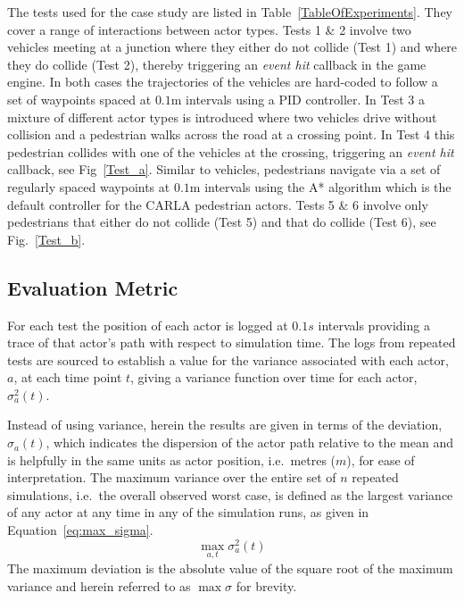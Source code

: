 The tests used for the case study are listed in Table~\ref{TableOfExperiments}. They cover a range of interactions between actor types. 
%
Tests 1 \& 2 involve two vehicles meeting at a junction where they either do not collide (Test 1) and where they do collide (Test 2), thereby triggering an \textit{event hit} callback in the game engine. In both cases the trajectories of the vehicles are hard-coded to follow a set of waypoints spaced at $0.1$m intervals using a PID controller. 
%
In Test 3 a mixture of different actor types is introduced where two vehicles drive without collision and a pedestrian walks across the road at a crossing point. 
%
In Test 4 this pedestrian collides with one of the vehicles at the crossing, triggering an \textit{event hit} callback, see Fig~\ref{Test_a}. Similar to vehicles, pedestrians navigate via a set of regularly spaced waypoints at $0.1$m intervals using the A* algorithm which is the default controller for the CARLA pedestrian actors. Tests 5 \& 6 involve only pedestrians that either do not collide (Test 5) and that do collide (Test 6), see Fig.~\ref{Test_b}. 


\subsection{Evaluation Metric}\label{s:Experiment_Description}
For each test the position of each actor is logged at $0.1s$ intervals providing a trace of that actor's path with respect to simulation time. The logs from repeated tests are sourced to establish a value for the variance associated with each actor, $a$, at each time point $t$, giving a variance function over time for each actor, $\sigma_a^{2}(t)$.

Instead of using variance, herein the results are given in terms of the deviation, $\sigma_a(t)$, which indicates the dispersion of the actor path relative to the mean and is helpfully in the same units as actor position, i.e.\ metres ($m$), for ease of interpretation. The maximum variance over the entire set of $n$ repeated simulations, i.e.\ the overall observed worst case, is defined as the largest variance of any actor at any time in any of the simulation runs, as given in Equation~\ref{eq:max_sigma}. 
\begin{equation} \label{eq:max_sigma}
\max_{a,t}\sigma_a^{2}(t)
\end{equation}
The maximum deviation is the absolute value of the square root of the maximum variance and herein referred to as ${\max\sigma}$ for brevity. 

